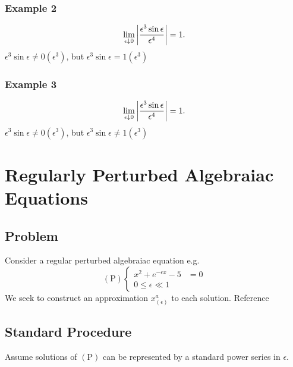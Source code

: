 \documentclass[12pt]{article}
\begin{document}
\subsubsection{Example 2}
$$\lim_{\epsilon\downarrow0}\left|{\frac{\epsilon^3\sin\epsilon}{\epsilon^4}}\right|=1.$$
$\epsilon^3\sin\epsilon\ne0(\epsilon^3)$, but $\epsilon^3\sin\epsilon=1(\epsilon^3)$
\subsubsection{Example 3}
$$\lim_{\epsilon\downarrow0}\left|{\frac{\epsilon^3\sin\epsilon}{\epsilon^4}}\right|=1.$$
$\epsilon^3\sin\epsilon\ne0(\epsilon^3)$, but $\epsilon^3\sin\epsilon\ne1(\epsilon^3)$

\section{Regularly Perturbed Algebraiac Equations}
\subsection{Problem}
Consider a regular perturbed algebraiac equation e.g.
\begin{equation}
  (\text{P}) \left\{
    \begin{aligned}
      x^2+e^{-\epsilon x} - 5 &= 0\\
      0 \le \epsilon \ll 1
    \end{aligned}
  \right.
\end{equation}
We seek to construct an approximation $x^{a}_{(\epsilon)}$ to each solution.
Reference 
\subsection{Standard Procedure}
Assume solutions of $(\text{P})$ can be represented by a standard power series
in $\epsilon$.
\end{document}
